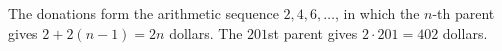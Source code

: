 The donations form the arithmetic sequence $2,4,6,\dots$, in which the $n$-th parent gives $2+2(n-1)=2n$ dollars. The $201$st parent gives $2\cdot201=\boxed{402}$ dollars.
